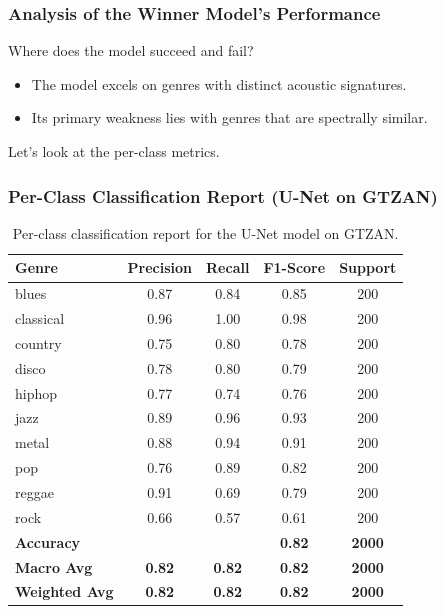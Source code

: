 \documentclass{beamer}
\begin{document}
\begin{frame}
    \frametitle{Analysis of the Winner Model's Performance}
    Where does the model succeed and fail?
    \begin{itemize}
        \item The model excels on genres with distinct acoustic signatures.
        \item Its primary weakness lies with genres that are spectrally similar.
    \end{itemize}
    Let's look at the per-class metrics.
\end{frame}

\begin{frame}[plain]
    \frametitle{Per-Class Classification Report (U-Net on GTZAN)}

\begin{table}
\centering
\caption{Per-class classification report for the U-Net model on GTZAN.}
\small %
\begin{tabular}{lcccc}
\toprule
\textbf{Genre} & \textbf{Precision} & \textbf{Recall} & \textbf{F1-Score} & \textbf{Support} \\
\midrule
blues & 0.87 & 0.84 & 0.85 & 200 \\
classical & 0.96 & 1.00 & 0.98 & 200 \\
country & 0.75 & 0.80 & 0.78 & 200 \\
disco & 0.78 & 0.80 & 0.79 & 200 \\
hiphop & 0.77 & 0.74 & 0.76 & 200 \\
jazz & 0.89 & 0.96 & 0.93 & 200 \\
metal & 0.88 & 0.94 & 0.91 & 200 \\
pop & 0.76 & 0.89 & 0.82 & 200 \\
reggae & 0.91 & 0.69 & 0.79 & 200 \\
rock & 0.66 & 0.57 & 0.61 & 200 \\
\midrule
\textbf{Accuracy} & & & \textbf{0.82} & \textbf{2000} \\
\textbf{Macro Avg} & \textbf{0.82} & \textbf{0.82} & \textbf{0.82} & \textbf{2000} \\
\textbf{Weighted Avg} & \textbf{0.82} & \textbf{0.82} & \textbf{0.82} & \textbf{2000} \\
\bottomrule
\end{tabular}
\end{table}
\end{frame}
\end{document}

